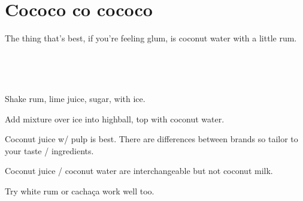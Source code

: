 \section{Cococo co cococo}


\begin{recipestats}[
	servings=1,
	preptime=5 \minute,
	source=Teresi Family,
	vegetarian=vegan,
]
\end{recipestats}


\begin{recipeabstract}
	The thing that's best, if you're feeling glum, is coconut water with a little rum.
\end{recipeabstract}


\begin{ingredientcolumns}
	\begin{ingredientblock}
		\\
	\end{ingredientblock}
	\begin{ingredientblock}
		\ingredient[2][\fluidounce]{spiced rum}\\
		\ingredient[1][\Tablespoon]{sugar}
	\end{ingredientblock}
\end{ingredientcolumns}


\begin{preparation}
\item Shake rum, lime juice, sugar, with ice.
\item Add mixture over ice into highball, top with coconut water.
\end{preparation}


\begin{variation}
\item Coconut juice w/ pulp is best.
	There are differences between brands so tailor to your taste / ingredients.
\item Coconut juice / coconut water are interchangeable but not coconut milk.
\item Try white rum or cacha\c{c}a work well too.
\end{variation}

\recipeend
